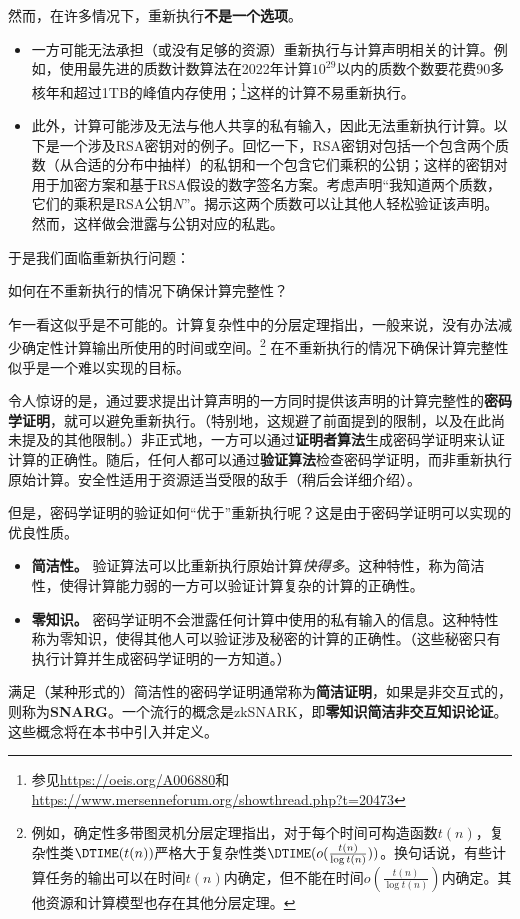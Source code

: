 \documentclass[american,singlepageview]{snargs-book-zh}
\begin{document}
然而，在许多情况下，重新执行\textbf{不是一个选项}。
\begin{itemize}
  \item 一方可能无法承担（或没有足够的资源）重新执行与计算声明相关的计算。例如，使用最先进的质数计数算法在2022年计算$10^{29}$以内的质数个数要花费90多核年和超过1TB的峰值内存使用；\footnote{参见\url{https://oeis.org/A006880}和\url{https://www.mersenneforum.org/showthread.php?t=20473}}这样的计算不易重新执行。
  \item 此外，计算可能涉及无法与他人共享的私有输入，因此无法重新执行计算。以下是一个涉及RSA密钥对的例子。回忆一下，RSA密钥对包括一个包含两个质数（从合适的分布中抽样）的私钥和一个包含它们乘积的公钥；这样的密钥对用于加密方案和基于RSA假设的数字签名方案。考虑声明“我知道两个质数，它们的乘积是RSA公钥$N$”。揭示这两个质数可以让其他人轻松验证该声明。然而，这样做会泄露与公钥对应的私匙。
\end{itemize}
于是我们面临重新执行问题：
\begin{center}
如何在不重新执行的情况下确保计算完整性？
\end{center}
乍一看这似乎是不可能的。计算复杂性中的分层定理指出，一般来说，没有办法减少确定性计算输出所使用的时间或空间。\footnote{例如，确定性多带图灵机分层定理指出，对于每个时间可构造函数$t(n)$，复杂性类$\DTIME(t(n))$严格大于复杂性类$\DTIME(o(\frac{t(n)}{\log t(n)}))$。换句话说，有些计算任务的输出可以在时间$t(n)$内确定，但不能在时间$o(\frac{t(n)}{\log t(n)})$内确定。其他资源和计算模型也存在其他分层定理。} 在不重新执行的情况下确保计算完整性似乎是一个难以实现的目标。

令人惊讶的是，通过要求提出计算声明的一方同时提供该声明的计算完整性的\textbf{密码学证明}，就可以避免重新执行。（特别地，这规避了前面提到的限制，以及在此尚未提及的其他限制。）非正式地，一方可以通过\textbf{证明者算法}生成密码学证明来认证计算的正确性。随后，任何人都可以通过\textbf{验证算法}检查密码学证明，而非重新执行原始计算。安全性适用于资源适当受限的敌手（稍后会详细介绍）。

但是，密码学证明的验证如何“优于”重新执行呢？这是由于密码学证明可以实现的优良性质。
\begin{itemize}
  \item \textbf{简洁性。} 验证算法可以比重新执行原始计算\emph{快得多}。这种特性，称为简洁性，使得计算能力弱的一方可以验证计算复杂的计算的正确性。
  \item \textbf{零知识。} 密码学证明不会泄露任何计算中使用的私有输入的信息。这种特性称为零知识，使得其他人可以验证涉及秘密的计算的正确性。（这些秘密只有执行计算并生成密码学证明的一方知道。）
\end{itemize}
满足（某种形式的）简洁性的密码学证明通常称为\textbf{简洁证明}，如果是非交互式的，则称为\textbf{SNARG}。一个流行的概念是zkSNARK，即\textbf{零知识简洁非交互知识论证}。这些概念将在本书中引入并定义。
\end{document}

